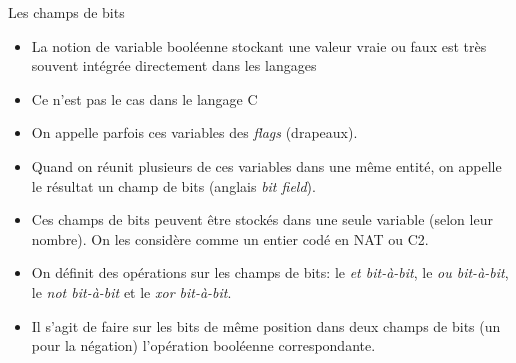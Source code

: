 \begin{frame}{Les champs de bits}
  \begin{itemize}
  \item La notion de variable booléenne stockant une valeur vraie ou faux est
    très souvent intégrée directement dans les langages
  \item[\dialogerror] Ce n'est pas le cas dans le langage C
  \item On appelle parfois ces variables des \emph{flags} (drapeaux).
  \item Quand on réunit plusieurs de ces variables dans une même entité, on
    appelle le résultat un champ de bits (anglais \emph{bit field}).
  \item Ces champs de bits peuvent être stockés dans une seule variable (selon
    leur nombre). On les considère comme un entier codé en NAT ou C2.
  \item On définit des opérations sur les champs de bits: le \emph{et
      bit-à-bit}, le \emph{ou bit-à-bit}, le \emph{not bit-à-bit} et le
    \emph{xor bit-à-bit}.
  \item[\dialogsystem] Il s'agit de faire sur les bits de même position dans
    deux champs de bits (un pour la négation) l'opération booléenne
    correspondante.
  \end{itemize}
\end{frame}
